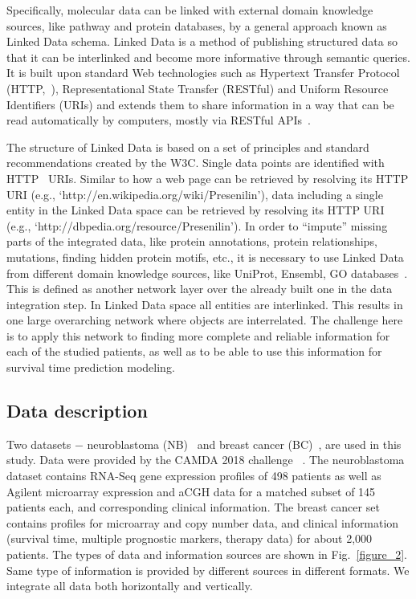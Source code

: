 \documentclass{bmcart}
\begin{document}
Specifically, molecular data can be linked with external domain
knowledge sources, like pathway and protein databases, by a general
approach known as Linked Data schema. Linked Data is a method of
publishing structured data so that it can be interlinked and become
more informative through semantic queries. It is built upon standard
Web technologies such as Hypertext Transfer Protocol (HTTP,~\cite{1}),
Representational State Transfer (RESTful) and Uniform Resource
Identifiers (URIs) and extends them to share information in a way that
can be read automatically by computers, mostly via RESTful APIs~\cite{12}. 

The structure of Linked Data is based on a set of principles and
standard recommendations created by the W3C. Single data points
are identified with HTTP~\cite{1} URIs. Similar to how a web page can be
retrieved by resolving its HTTP URI (e.g.,
{\textquoteleft}http://en.wikipedia.org/wiki/Presenilin{\textquoteright}),
data including a single entity in the Linked Data space can be
retrieved by resolving its HTTP URI (e.g.,
{\textquoteleft}http://dbpedia.org/resource/Presenilin{\textquoteright}).
In order to {\textquotedblleft}impute{\textquotedblright} missing parts
of the integrated data, like protein annotations, protein
relationships, mutations, finding hidden protein motifs, etc., it is
necessary to use Linked Data from different domain knowledge sources,
like UniProt, Ensembl, GO databases~\cite{36, 37}. This is defined as
another network layer over the already built one in the data
integration step. In Linked Data space all entities are interlinked.
This  results in one large overarching network where objects are
interrelated. The challenge here is to apply this network to finding
more complete and reliable information for each of the studied
patients, as well as to be able to use this information for survival
time prediction modeling.

\subsection{Data description}

Two datasets $-$ neuroblastoma (NB)~\cite{33} and breast cancer (BC)~\cite{32},
are used in this study. Data were provided by the CAMDA 2018 challenge~\cite{35}
. The neuroblastoma dataset contains RNA-Seq gene expression profiles of
498 patients as well as Agilent microarray expression and aCGH data for
a matched subset of 145 patients each, and corresponding clinical
information. The breast cancer set contains profiles for microarray and
copy number data, and clinical information (survival time, multiple
prognostic markers, therapy data) for about 2,000 patients. The types
of data and information sources are shown in Fig.~\ref{figure_2}. Same type of
information is provided by different sources in different formats. We
integrate all data both horizontally and vertically.
\end{document}
